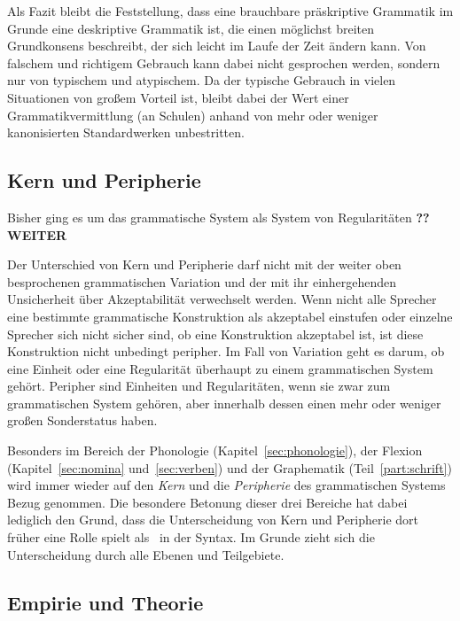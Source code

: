 Als Fazit bleibt die Feststellung, dass eine brauchbare präskriptive Grammatik im Grunde eine deskriptive Grammatik ist, die einen möglichst breiten Grundkonsens beschreibt, der sich leicht im Laufe der Zeit ändern kann.
Von falschem und richtigem Gebrauch kann dabei nicht gesprochen werden, sondern nur von typischem und atypischem.
Da der typische Gebrauch in vielen Situationen von großem Vorteil ist, bleibt dabei der Wert einer Grammatikvermittlung (\zB an Schulen) anhand von mehr oder weniger kanonisierten Standardwerken unbestritten.

\subsection{Kern und Peripherie}

\label{sec:kern}

Bisher ging es um das grammatische System als System von Regularitäten  \textbf{?? WEITER}

Der Unterschied von Kern und Peripherie darf nicht mit der weiter oben besprochenen grammatischen Variation und der mit ihr einhergehenden Unsicherheit über Akzeptabilität verwechselt werden.
Wenn nicht alle Sprecher eine bestimmte grammatische Konstruktion als akzeptabel einstufen oder einzelne Sprecher sich nicht sicher sind, ob eine Konstruktion akzeptabel ist, ist diese Konstruktion nicht unbedingt peripher.
Im Fall von Variation geht es darum, ob eine Einheit oder eine Regularität überhaupt zu einem grammatischen System gehört.
Peripher sind Einheiten und Regularitäten, wenn sie zwar zum grammatischen System gehören, aber innerhalb dessen einen mehr oder weniger großen Sonderstatus haben.

Besonders im Bereich der Phonologie (Kapitel~\ref{sec:phonologie}), der Flexion (Kapitel~\ref{sec:nomina} und~\ref{sec:verben}) und der Graphematik (Teil~\ref{part:schrift}) wird immer wieder auf den \textit{Kern} und die \textit{Peripherie} des grammatischen Systems Bezug genommen.
Die besondere Betonung dieser drei Bereiche hat dabei lediglich den Grund, dass die Unterscheidung von Kern und Peripherie dort früher eine Rolle spielt als \zB\ in der Syntax.
Im Grunde zieht sich die Unterscheidung durch alle Ebenen und Teilgebiete.

\subsection{Empirie und Theorie}

\label{sec:deskriptivtheoretisch}

